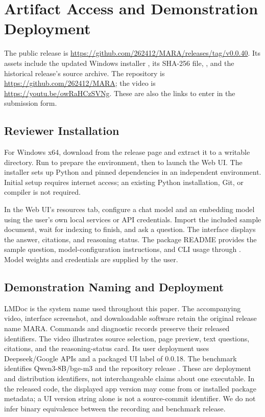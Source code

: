 \section{Artifact Access and Demonstration Deployment}
\label{app:artifact}
The public release is
\url{https://github.com/262412/MARA/releases/tag/v0.0.40}.
Its assets include the updated Windows installer , its SHA-256 file,
,
and the historical release's source archive. The repository is
\url{https://github.com/262412/MARA};
the video is
\url{https://youtu.be/owRaHCzSVNg}.
These are also the links to enter in the submission form.

\subsection{Reviewer Installation}
For Windows x64, download  from the release page and extract it to a writable directory. Run  to prepare the environment, then  to launch the Web UI. The installer sets up Python and pinned dependencies in an independent environment. Initial setup requires internet access; an existing Python installation, Git, or compiler is not required.

In the Web UI's resources tab, configure a chat model and an embedding model using the user's own local services or API credentials. Import the included sample document, wait for indexing to finish, and ask a question. The interface displays the answer, citations, and reasoning status. The package README provides the sample question, model-configuration instructions, and CLI usage through . Model weights and credentials are supplied by the user.

\subsection{Demonstration Naming and Deployment}
LMDoc is the system name used throughout this paper. The accompanying video, interface screenshot, and downloadable software retain the original release name MARA. Commands and diagnostic records preserve their released identifiers. The video illustrates source selection, page preview, text questions, citations, and the reasoning-status card. Its user deployment uses Deepseek/Google APIs and a packaged UI label of 0.0.18. The benchmark identifies Qwen3-8B/bge-m3 and the repository release . These are deployment and distribution identifiers, not interchangeable claims about one executable. In the released code, the displayed app version may come from  or installed package metadata; a UI version string alone is not a source-commit identifier. We do not infer binary equivalence between the recording and benchmark release.

